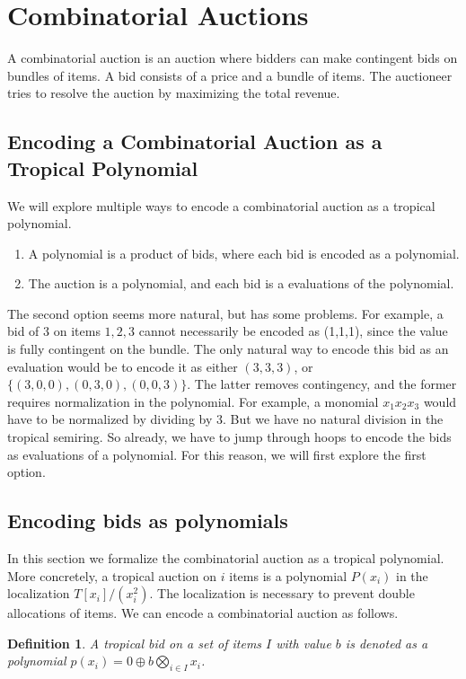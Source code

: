 \documentclass{article}
\newtheorem{definition}{Definition}
\begin{document}
\section{Combinatorial Auctions}
A combinatorial auction is an auction where bidders can make contingent bids on bundles of items.
A bid consists of a price and a bundle of items.
The auctioneer tries to resolve the auction by maximizing the total revenue.

\subsection{Encoding a Combinatorial Auction as a Tropical Polynomial}
We will explore multiple ways to encode a combinatorial auction as a tropical polynomial.
\begin{enumerate}
	\item A polynomial is a product of bids, where each bid is encoded as a polynomial.
	\item The auction is a polynomial, and each bid is a evaluations of the polynomial.
\end{enumerate}

The second option seems more natural, but has some problems.
For example, a bid of $3$ on items $1,2,3$ cannot necessarily be encoded as (1,1,1), since the value is fully contingent on the bundle.
The only natural way to encode this bid as an evaluation would be to encode it as either $(3,3,3)$, or $\{(3,0,0), (0,3,0), (0,0,3)\}$.
The latter removes contingency, and the former requires normalization in the polynomial.
For example, a monomial $x_1 x_2 x_3$ would have to be normalized by dividing by 3.
But we have no natural division in the tropical semiring.
So already, we have to jump through hoops to encode the bids as evaluations of a polynomial.
For this reason, we will first explore the first option.

\subsection{Encoding bids as polynomials}
In this section we formalize the combinatorial auction as a tropical polynomial.
More concretely, a tropical auction on $i$ items is a polynomial $P(x_i)$ in the localization $T[x_i] / (x_i^2)$.
The localization is necessary to prevent double allocations of items.
We can encode a combinatorial auction as follows.

\begin{definition}
	A tropical bid on a set of items $I$ with value $b$ is denoted as a polynomial $ p(x_i) = 0 \oplus b\bigotimes_{i \in I} x_i$.
\end{definition}
\end{document}
